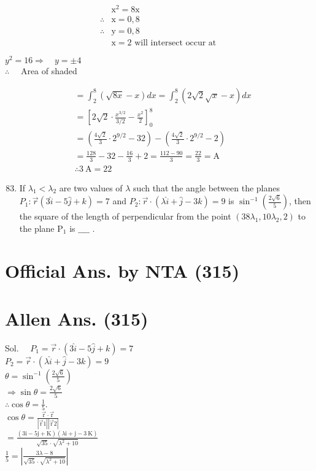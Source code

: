 \documentclass[10pt]{article}
\begin{document}
\[
\begin{array}{ll} 
& \mathrm{x}^{2}=8 \mathrm{x} \\
\therefore & \mathrm{x}=0,8 \\
\therefore & \mathrm{y}=0,8 \\
& \mathrm{x}=2 \text { will intersect occur at }
\end{array}
\]

\(y^{2}=16 \Rightarrow \quad y= \pm 4\)\\
\(\therefore \quad\) Area of shaded

\[
\begin{aligned}
& =\int_{2}^{8}(\sqrt{8 x}-x) d x=\int_{2}^{8}(2 \sqrt{2} \sqrt{x}-x) d x \\
& =\left[2 \sqrt{2} \cdot \frac{x^{3 / 2}}{3 / 2}-\frac{x^{2}}{2}\right]_{0}^{8} \\
& =\left(\frac{4 \sqrt{2}}{3} \cdot 2^{9 / 2}-32\right)-\left(\frac{4 \sqrt{2}}{3} \cdot 2^{9 / 2}-2\right) \\
& =\frac{128}{3}-32-\frac{16}{3}+2=\frac{112-90}{3}=\frac{22}{3}=\mathrm{A} \\
& \therefore 3 \mathrm{~A}=22
\end{aligned}
\]

\begin{enumerate}
  \setcounter{enumi}{82}
  \item If \(\lambda_{1}<\lambda_{2}\) are two values of \(\lambda\) such that the angle between the planes \(P_{1}: \vec{r}(3 \hat{i}-5 \hat{j}+k)=7\) and \(P_{2}: \vec{r} \cdot(\lambda \hat{i}+\hat{j}-3 k)=9\) is \(\sin ^{-1}\left(\frac{2 \sqrt{6}}{5}\right)\), then the square of the length of perpendicular from the point \(\left(38 \lambda_{1}, 10 \lambda_{2}, 2\right)\) to the plane \(\mathrm{P}_{1}\) is \(\_\_\_\_\) .
\end{enumerate}

\section*{Official Ans. by NTA (315)}
\section*{Allen Ans. (315)}
Sol. \(\quad P_{1}=\vec{r} \cdot(3 \hat{i}-5 \hat{j}+k)=7\)\\
\(P_{2}=\vec{r} \cdot(\lambda \hat{i}+\hat{j}-3 k)=9\)\\
\(\theta=\sin ^{-1}\left(\frac{2 \sqrt{6}}{5}\right)\)\\
\(\Rightarrow \sin \theta=\frac{2 \sqrt{6}}{5}\)\\
\(\therefore \cos \theta=\frac{1}{5}\).\\
\(\cos \theta=\frac{\overrightarrow{\mathrm{r}} \cdot \overrightarrow{\mathrm{r}}}{|\overrightarrow{\mathrm{r}} 1||\overrightarrow{\mathrm{r}} 2|}\)\\
\(=\frac{(3 \mathrm{i}-5 \mathrm{j}+\mathrm{K})(\lambda \mathrm{i}+\mathrm{j}-3 \mathrm{~K})}{\sqrt{35} \cdot \sqrt{\lambda^{2}+10}}\)\\
\(\frac{1}{5}=\left|\frac{3 \lambda-8}{\sqrt{35} \cdot \sqrt{\lambda^{2}+10}}\right|\)
\end{document}
